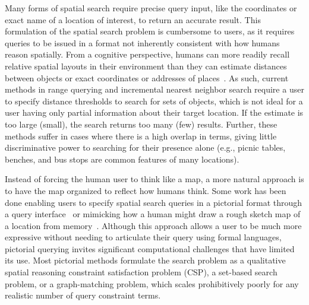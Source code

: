 \par{Many forms of spatial search require precise query input, like the coordinates or exact name of a location of interest, to return an accurate result. 
This formulation of the spatial search problem is cumbersome to users, as it requires queries to be issued in a format not inherently consistent with how humans reason spatially.
From a cognitive perspective, humans can more readily recall relative spatial layouts in their environment than they can estimate distances between objects or exact coordinates or addresses of places~\cite{Schwering2014, Weisberg2016, Miller2013, Keatley2021}.
As such, current methods in range querying and incremental nearest neighbor search require a user to specify distance thresholds to search for sets of objects, which is not ideal for a user having only partial information about their target location.
If the estimate is too large (small), the search returns too many (few) results. 
Further, these methods suffer in cases where there is a high overlap in terms, giving little discriminative power to searching for their presence alone (e.g., picnic tables, benches, and bus stops are common features of many locations). 
}
%
\par{Instead of forcing the human user to think like a map, a more natural approach is to have the map organized to reflect how humans think. 
Some work has been done enabling users to specify spatial search queries in a pictorial format through a query interface~\cite{Soffer1997,DiLoreto1996} or mimicking how a human might draw a rough sketch map of a location from memory~\cite{Schwering2014}.
Although this approach allows a user to be much more expressive without needing to articulate their query using formal languages, pictorial querying invites significant computational challenges that have limited its use. 
Most pictorial methods formulate the search problem as a qualitative spatial reasoning constraint satisfaction problem (CSP), a set-based search problem, or a graph-matching problem, which scales prohibitively poorly for any realistic number of query constraint terms.
}

